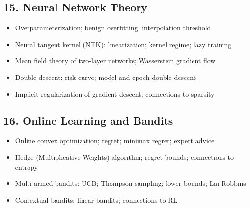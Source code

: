 \subsection{15. Neural Network Theory}
\begin{itemize}
\item Overparameterization; benign overfitting; interpolation threshold
\item Neural tangent kernel (NTK): linearization; kernel regime; lazy training
\item Mean field theory of two-layer networks; Wasserstein gradient flow
\item Double descent: risk curve; model and epoch double descent
\item Implicit regularization of gradient descent; connections to sparsity
\end{itemize}

\subsection{16. Online Learning and Bandits}
\begin{itemize}
\item Online convex optimization; regret; minimax regret; expert advice
\item Hedge (Multiplicative Weights) algorithm; regret bounds; connections to entropy
\item Multi-armed bandits: UCB; Thompson sampling; lower bounds; Lai-Robbins
\item Contextual bandits; linear bandits; connections to RL
\end{itemize}

